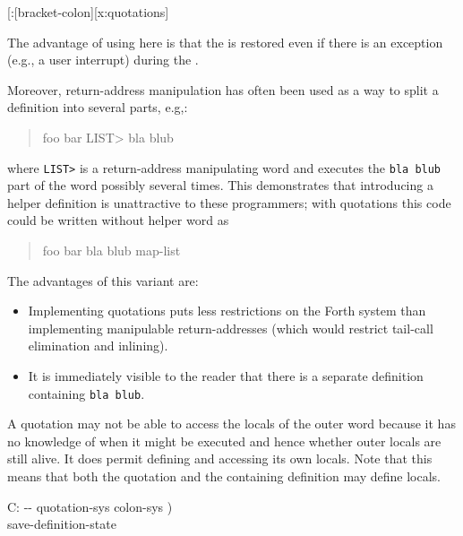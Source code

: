 \begin{worddef}{}{[:}[bracket-colon][x:quotations]
\begin{rationale}
		The advantage of using  here is that
		the  is restored even if there is an exception (e.g.,
		a user interrupt) during the .

		Moreover, return-address manipulation has often been used as a way to
		split a definition into several parts, e.g,:

		\begin{quote}\ttfamily
		\word{:} foo bar LIST> bla blub \word{;}
		\end{quote}

		where \texttt{LIST>} is a return-address manipulating word and executes
		the \texttt{bla blub} part of the word possibly several times.  This
		demonstrates that introducing a helper definition is unattractive to
		these programmers; with quotations this code could be written without
		helper word as

		\begin{quote}\ttfamily
			\word{:} foo bar \word{[:} bla blub \word{;]} map-list \word{;}
		\end{quote}

		The advantages of this variant are:
		\begin{itemize}
		\item Implementing quotations puts less restrictions on the Forth
			system than implementing manipulable return-addresses
			(which would restrict tail-call elimination and inlining).
		\item It is immediately visible to the reader that there is a
			separate definition containing \texttt{bla blub}.
		\end{itemize}
		
		A quotation may not be able to access the locals of the outer word
		because it has no knowledge of when it might be executed and hence
		whether outer locals are still alive. It does permit defining and
		accessing its own locals.  Note that this means that both the
		quotation and the containing definition may define locals.
	\end{rationale}
	
	\begin{implement}
		
		\word{:} \word{[:}  C: -{}- quotation-sys colon-sys ) \\
		\tab {}  save-definition-state  \\
		\word{;} 
		

\end{implement}
\end{worddef}
